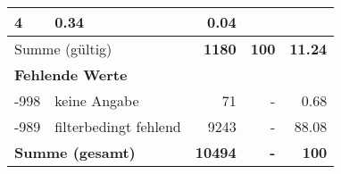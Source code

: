 \begin{longtable}{lXrrr}
       \num{4} &
       \num[round-mode=places,round-precision=2]{0,34} &
         \num[round-mode=places,round-precision=2]{0,04} \\
     \midrule
     \multicolumn{2}{l}{Summe (gültig)} &
       \textbf{\num{1180}} &
     \textbf{100} &
       \textbf{\num[round-mode=places,round-precision=2]{11,24}} \\
     \multicolumn{5}{l}{\textbf{Fehlende Werte}}\\
       -998 &
       keine Angabe &
         \num{71} &
        - &
         \num[round-mode=places,round-precision=2]{0,68} \\
       -989 &
       filterbedingt fehlend &
         \num{9243} &
        - &
         \num[round-mode=places,round-precision=2]{88,08} \\
     \midrule
     \multicolumn{2}{l}{\textbf{Summe (gesamt)}} &
          \textbf{\num{10494}} &
        \textbf{-} &
        \textbf{100} \\
     \bottomrule
     \end{longtable}
     
